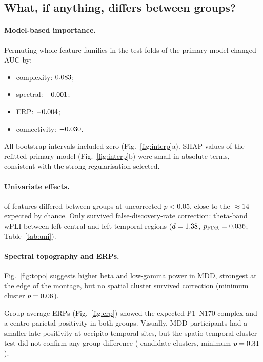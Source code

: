 \subsection{What, if anything, differs between groups?}
\paragraph{Model-based importance.} Permuting whole feature families in the test folds of the primary model
changed AUC by:
\begin{itemize}
  \item complexity: $0.083$;
  \item spectral: $-0.001$;
  \item ERP: $-0.004$;
  \item connectivity: $-0.030$.
\end{itemize}
All bootstrap intervals included zero (Fig.~\ref{fig:interp}a). SHAP values of the refitted primary model
(Fig.~\ref{fig:interp}b) were small in absolute terms, consistent with the strong regularisation selected.

\paragraph{Univariate effects.} \UniNSig{} of \UniNFeat{} features differed between groups at uncorrected $p<0.05$,
close to the $\approx14$ expected by chance. Only \UniNFdr{} survived false-discovery-rate correction: theta-band
wPLI between left central and left temporal regions ($d=1.38$, $p_\text{FDR}=0.036$; Table~\ref{tab:uni}).

\paragraph{Spectral topography and ERPs.} Fig.~\ref{fig:topo} suggests higher beta and low-gamma power in MDD,
strongest at the edge of the montage, but no spatial cluster survived correction (minimum cluster
$p=0.06$).

Group-average ERPs (Fig.~\ref{fig:erp}) showed the expected P1--N170 complex and a centro-parietal positivity in
both groups. Visually, MDD participants had a smaller late positivity at occipito-temporal sites, but the
spatio-temporal cluster test did not confirm any group difference (\ErpNClusters{} candidate clusters, minimum
$p=0.31$).

